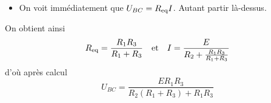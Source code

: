 \documentclass[../TDE1-E2.tex]{subfiles}%
\begin{document}
{\begin{center}
\begin{tcn}[sidebyside]
\begin{itemize}
            \item On voit immédiatement que $U_{BC} = R_{\rm eq}I$. Autant
                partir là-dessus.
        \end{itemize}
        \tcblower
        On obtient ainsi \[ R_{\rm eq} = \frac{R_1R_3}{R_1+R_3} \quad \text{et}
        \quad I = \frac{E}{R_2 + \frac{R_1R_3}{R_1+R_3}}\] d'où après calcul
        \[\boxed{U_{BC} = \frac{ER_1R_3}{R_2(R_1+R_3)+R_1R_3}}\]
    \end{tcn}
\end{center}
}%
\end{document}

